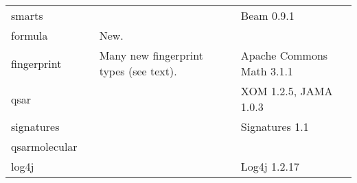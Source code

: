 \documentclass[10pt]{bmcart}
\begin{document}
\begin{backmatter}
\begin{minipage}{1\textwidth}
\begin{tabular}{lp{3cm}p{3cm}l}
  smarts                     &              & & Beam 0.9.1~\cite{Beam} \\
  formula                    &              & New. & \\ \hline
  fingerprint                &              & Many new fingerprint types (see text). & Apache Commons Math 3.1.1 \\ \hline
  qsar                       &              & & XOM 1.2.5, JAMA 1.0.3~\cite{Hicklin2012} \\ \hline
  signatures                 &              & & Signatures 1.1 \\ \hline %
  qsarmolecular              &              & & \\ \hline
  log4j                      &              & & Log4j 1.2.17 \\ \hline
    \end{tabular}
    \end{minipage}


\end{backmatter}
\end{document}
